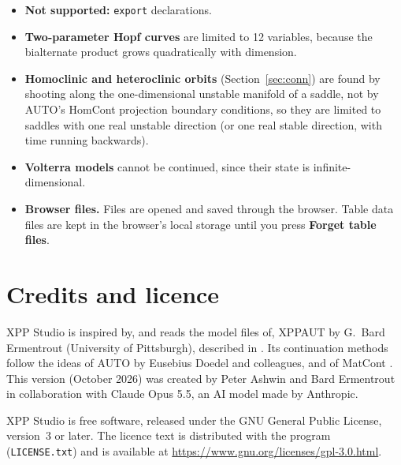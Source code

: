\documentclass[11pt,a4paper]{article}
\newcommand{\XS}{\textsf{XPP Studio}}
\newcommand{\XPP}{\textsf{XPPAUT}}
\newcommand{\ui}[1]{\textsf{\textbf{#1}}}          %
\begin{document}
\begin{itemize}
  \item \textbf{Not supported:} \texttt{export} declarations.
  \item \textbf{Two-parameter Hopf curves} are limited to 12 variables, because the bialternate product grows quadratically with dimension.
  \item \textbf{Homoclinic and heteroclinic orbits} (Section~\ref{sec:conn}) are found by shooting along the one-dimensional unstable manifold of a saddle, not by \textsf{AUTO}'s \textsf{HomCont} projection boundary conditions, so they are limited to saddles with one real unstable direction (or one real stable direction, with time running backwards).
  \item \textbf{Volterra models} cannot be continued, since their state is infinite-dimensional.
  \item \textbf{Browser files.} Files are opened and saved through the browser. Table data files are kept in the browser's local storage until you press \ui{Forget table files}.
\end{itemize}

\section{Credits and licence}

\XS{} is inspired by, and reads the model files of, \XPP{} by G.~Bard Ermentrout (University of Pittsburgh), described in \cite{ermentrout2002}. Its continuation methods follow the ideas of \textsf{AUTO} \cite{doedel2007} by Eusebius Doedel and colleagues, and of \textsf{MatCont} \cite{dhooge2003}. This version (October 2026) was created by Peter Ashwin and Bard Ermentrout in collaboration with Claude Opus 5.5, an AI model made by Anthropic.

\XS{} is free software, released under the GNU General Public License, version~3 or later. The licence text is distributed with the program (\texttt{LICENSE.txt}) and is available at \url{https://www.gnu.org/licenses/gpl-3.0.html}.
\end{document}
